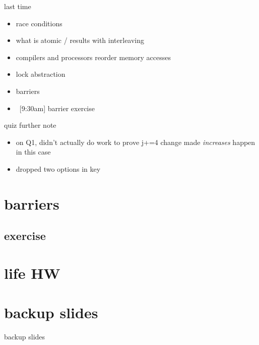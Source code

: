 \date{}
\title{}
\date{}

\begin{frame}
    \titlepage
\end{frame}



\begin{frame}{last time}
    \begin{itemize}
    \item race conditions
    \item what is atomic / results with interleaving
    \item compilers and processors reorder memory accesses
    \item lock abstraction
    \item barriers
    \item{}~[9:30am] barrier exercise
    \end{itemize}
\end{frame}

\begin{frame}{quiz further note}
    \begin{itemize}
    \item on Q1, didn't actually do work to prove j+=4 change made \textit{increases} happen in this case
    \item dropped two options in key
    \end{itemize}
\end{frame}

\section{barriers}


\subsection{exercise}


\section{life HW}







\section{backup slides}
\begin{frame}{backup slides}
\end{frame}







